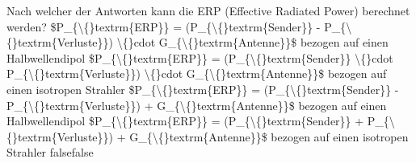     {Nach welcher der Antworten kann die ERP (Effective Radiated Power) berechnet werden?}
    {\$P\_\{\textbackslash\{\}textrm\{ERP\}\} = (P\_\{\textbackslash\{\}textrm\{Sender\}\} - P\_\{\textbackslash\{\}textrm\{Verluste\}\}) \textbackslash\{\}cdot G\_\{\textbackslash\{\}textrm\{Antenne\}\}\$ bezogen auf einen Halbwellendipol}
    {\$P\_\{\textbackslash\{\}textrm\{ERP\}\} = (P\_\{\textbackslash\{\}textrm\{Sender\}\} \textbackslash\{\}cdot P\_\{\textbackslash\{\}textrm\{Verluste\}\}) \textbackslash\{\}cdot G\_\{\textbackslash\{\}textrm\{Antenne\}\}\$ bezogen auf einen isotropen Strahler}
    {\$P\_\{\textbackslash\{\}textrm\{ERP\}\} = (P\_\{\textbackslash\{\}textrm\{Sender\}\} - P\_\{\textbackslash\{\}textrm\{Verluste\}\}) + G\_\{\textbackslash\{\}textrm\{Antenne\}\}\$ bezogen auf einen Halbwellendipol}
    {\$P\_\{\textbackslash\{\}textrm\{ERP\}\} = (P\_\{\textbackslash\{\}textrm\{Sender\}\} + P\_\{\textbackslash\{\}textrm\{Verluste\}\}) + G\_\{\textbackslash\{\}textrm\{Antenne\}\}\$ bezogen auf einen isotropen Strahler}
    {false}{false}